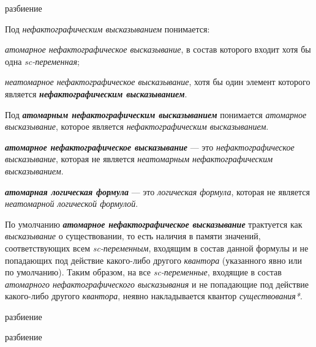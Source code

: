\begin{SCn}
\begin{scnrelfromset}{разбиение}
\end{scnrelfromset}
\end{SCn}

Под \textit{нефактографическим высказыванием} понимается:
\begin{textitemize}
	\item \textit{атомарное нефактографическое высказывание}, в состав которого входит хотя бы одна \textit{sc-переменная};
	\item \textit{неатомарное нефактографическое высказывание}, хотя бы один элемент которого является \textbf{\textit{нефактографическим высказыванием}}.
\end{textitemize}

Под \textbf{\textit{атомарным нефактографическим высказыванием}} понимается \textit{атомарное высказывание}, которое является \textit{нефактографическим высказыванием}.

\textbf{\textit{атомарное нефактографическое высказывание}} --- это \textit{нефактографическое высказывание}, которая не является \textit{неатомарным нефактографическим высказыванием}.

\textbf{\textit{атомарная логическая формула}} --- это \textit{логическая формула}, которая не является \textit{неатомарной логической формулой}.

По умолчанию \textbf{\textit{атомарное нефактографическое высказывание}} трактуется как \textit{высказывание} о существовании, то есть наличия в памяти значений, соответствующих всем \textit{sc-переменным}, входящим в состав данной формулы и не попадающих под действие какого-либо другого \textit{квантора} (указанного явно или по умолчанию). Таким образом, на все \textit{sc-переменные}, входящие в состав \textit{атомарного нефактографического высказывания} и не попадающие под действие какого-либо другого \textit{квантора}, неявно накладывается квантор \textit{существования*}.

\begin{SCn}
\begin{scnrelfromset}{разбиение}
	\begin{scnrelfromset}{разбиение}
	\end{scnrelfromset}
\end{scnrelfromset}
\end{SCn}

